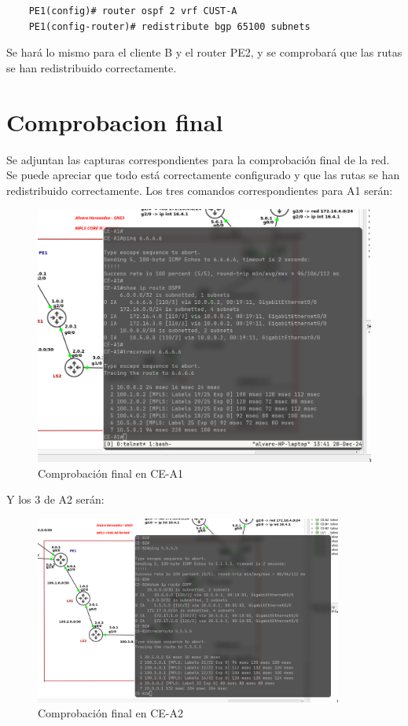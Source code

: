 \documentclass{article}
\begin{document}
\begin{verbatim}
    PE1(config)# router ospf 2 vrf CUST-A
    PE1(config-router)# redistribute bgp 65100 subnets
\end{verbatim}

Se hará lo mismo para el cliente B y el router PE2, y se comprobará que las rutas se han redistribuido correctamente.

\section{Comprobacion final}

Se adjuntan las capturas correspondientes para la comprobación final de la red. Se puede apreciar que todo está correctamente configurado y que las rutas se han redistribuido correctamente. Los tres comandos correspondientes para A1 serán:

\begin{figure}[h]
    \centering
    \includegraphics[width=1\textwidth]{src/comprobacion1.png}
    \caption{Comprobación final en CE-A1}
\end{figure}

Y los 3 de A2 serán:

\begin{figure}[h]
    \centering
    \includegraphics[width=0.9\textwidth]{src/comprobacion2.png}
    \caption{Comprobación final en CE-A2}
\end{figure}
\end{document}
